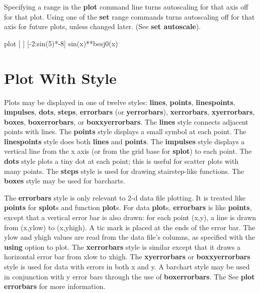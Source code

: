 Specifying a range in the {\bf plot} command line turns autoscaling for
that axis off for that plot. Using one of the {\bf set} range commands
turns autoscaling off for that axis for future plots, unless changed
later. (See {\bf set autoscale}).

 {plot [ ] [-2:sin(5)*-8] sin(x)**besj0(x)}

\section{Plot With Style}
Plots may be displayed in one of twelve styles: {\bf lines}, {\bf points},
{\bf linespoints}, {\bf impulses}, {\bf dots}, {\bf steps},
{\bf errorbars} (or {\bf yerrorbars}), {\bf xerrorbars}, {\bf xyerrorbars},
{\bf boxes}, {\bf boxerrorbars}, or {\bf boxxyerrorbars}. The {\bf lines} style
connects adjacent points with lines. The {\bf points} style displays a
small symbol at each point. The {\bf linespoints} style does both
{\bf lines} and {\bf points}. The {\bf impulses} style displays a vertical line
from the x axis (or from the grid base for {\bf splot}) to each point. The
{\bf dots} style plots a tiny dot at each point; this is useful for
scatter plots with many points. The {\bf steps} style is used for drawing 
stairstep-like functions. The {\bf boxes} style may be used for barcharts.

The {\bf errorbars} style is only relevant to 2-d data file plotting. It
is treated like {\bf points} for {\bf splot}s and function {\bf plot}s. For 
data
{\bf plot}s, {\bf errorbars} is like {\bf points}, except that a vertical error
bar is also drawn: for each point (x,y), a line is drawn from
(x,ylow) to (x,yhigh). A tic mark is placed at the ends of the error
bar. The ylow and yhigh values are read from the data file's columns,
as specified with the {\bf using} option to plot. The {\bf xerrorbars}
style is similar except that it draws a horizontal error bar from xlow to
xhigh. The {\bf xyerrorbars} or {\bf boxxyerrorbars} style is used for data 
with errors in both x and y. A barchart style may be used in conjunction with y 
error bars through the use of {\bf boxerrorbars}. The See {\bf plot errorbars} 
for more information.

